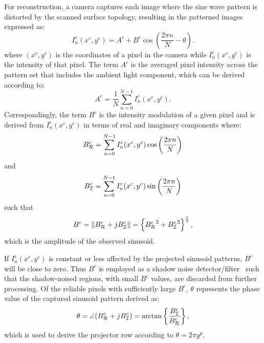 \documentclass[10pt]{article}
\begin{document}
For reconstruction, a camera captures each image where the sine wave pattern is distorted by the scanned surface topology, resulting in the patterned images expressed as:
\begin{equation}
    I_n^c(x^c, y^c) = A^c + B^c \cos\left( \frac{2\pi n}{N} - \theta \right).
    \label{EQ:CameraPattern}
\end{equation}
where $(x^c, y^c)$ is the coordinates of a pixel in the camera while $I_n^c(x^c, y^c)$ is the intensity of that pixel. The term $A^c$ is the averaged pixel intensity across the pattern set that includes the ambient light component, which can be derived according to:
\begin{equation}
    A^c = \frac{1}{N}\sum_{n=0}^{N-1}I_n^c(x^c, y^c).
    \label{EQ:Ac}
\end{equation}
Correspondingly, the term $B^c$ is the intensity modulation of a given pixel and is derived from $I_n^c(x^c, y^c)$ in terms of real and imaginary components where: 
\begin{equation}
    B^c_{\cal R}  =  \sum_{n=0}^{N-1}I_n^c(x^c, y^c) \cos\left(\frac{2\pi n}{N}\right)
    \label{bcCosEqn}
\end{equation}
and
\begin{equation}
    B^c_{\cal I}  =  \sum_{n=0}^{N-1}I_n^c(x^c, y^c) \sin\left(\frac{2\pi n}{N}\right)
    \label{bcSinEqn}
\end{equation}
such that 
\begin{equation}
    B^c  =  \left\| {B^c_{\cal R}}+j{B^c_{\cal I}}   \right\| =  \left\{ {B^c_{\cal R}}^2+{B^c_{\cal I}}^2 \right\}^\frac{1}{2},
\end{equation}
which is the amplitude of the observed sinusoid.

If $I_n^c(x^c, y^c)$ is constant or less affected by the projected sinusoid patterns, $B^c$ will be close to zero. Thus $B^c$ is employed as a shadow noise detector/filter~\cite{Li:97} such that the shadow-noised regions, with small $B^c$ values, are discarded from further processing. Of the reliable pixels with sufficiently large $B^c$, $\theta$ represents the phase value of the captured sinusoid pattern derived as:
\begin{equation}
    \theta = \angle ({B^c_{\cal R}}+j{B^c_{\cal I}}) =   \arctan \left\{\frac{B^c_{\cal I}}{B^c_{\cal R}}\right\},
    \label{EQ:Phase}
\end{equation}
which is used to derive the projector row according to $\theta=2\pi y^p$.
\end{document}
